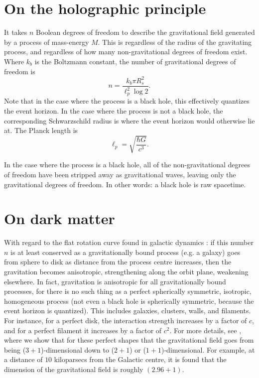 \documentclass[12pt]{article}
\begin{document}
\section{On the holographic principle}

It takes $n$ Boolean degrees of freedom to describe the gravitational field \cite{hooft, susskind} generated by a process of mass-energy $M$.
This is regardless of the radius of the gravitating process, and regardless of how many non-gravitational degrees of freedom exist.
Where $k_b$ is the Boltzmann constant, the number of gravitational degrees of freedom is
\begin{equation}
n = \frac{k_b \pi R_s^2}{ \ell_p^2 \log 2}.
\end{equation}
Note that in the case where the process is a black hole, this effectively quantizes the event horizon.
In the case where the process is not a black hole, the corresponding Schwarzschild radius is where the event horizon would otherwise lie at.
The Planck length is
\begin{equation}
\ell_p = \sqrt{\frac{\hbar G}{c^3}}.
\end{equation}

In the case where the process is a black hole, all of the non-gravitational degrees of freedom have been stripped away as gravitational waves, leaving only the gravitational degrees of freedom.
In other words: a black hole is raw spacetime.






\section{On dark matter}

With regard to the flat rotation curve found in galactic dynamics \cite{binney}: if this number $n$ is at least conserved as a gravitationally bound process (e.g. a galaxy) goes from sphere to disk as distance from the process centre increases, then the gravitation becomes anisotropic, strengthening along the orbit plane, weakening elsewhere.
In fact, gravitation is anisotropic for all gravitationally bound processes, for there is no such thing as a perfect spherically symmetric, isotropic, homogeneous process (not even a black hole is spherically symmetric, because the event horizon is quantized).
This includes galaxies, clusters, walls, and filaments.
For instance, for a perfect disk, the interaction strength increases by a factor of $c$, and for a perfect filament it increases by a factor of $c^2$.
For more details, see \cite{halayka}, where we show that for these perfect shapes that the gravitational field goes from being ($3+1$)-dimensional down to ($2+1$) or ($1+1$)-dimensional.
For example, at a distance of $10$ kiloparsecs from the Galactic centre, it is found that the dimension of the gravitational field is roughly $(2.96 + 1)$.
\end{document}
